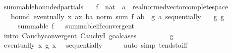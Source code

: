 \begin{isabellebody}
\isanewline
%
\endisadelimproof
\isanewline
{}\isamarkupfalse%
\ summable{\isacharunderscore}{\kern0pt}bounded{\isacharunderscore}{\kern0pt}partials{\isacharcolon}{\kern0pt}\isanewline
\ \ \ f\ {\isacharcolon}{\kern0pt}{\isacharcolon}{\kern0pt}\ {\isachardoublequoteopen}nat\ {\isasymRightarrow}\ {\isacharprime}{\kern0pt}a\ {\isacharcolon}{\kern0pt}{\isacharcolon}{\kern0pt}\ {\isacharbraceleft}{\kern0pt}real{\isacharunderscore}{\kern0pt}normed{\isacharunderscore}{\kern0pt}vector{\isacharcomma}{\kern0pt}complete{\isacharunderscore}{\kern0pt}space{\isacharbraceright}{\kern0pt}{\isachardoublequoteclose}\isanewline
\ \ \ bound{\isacharcolon}{\kern0pt}\ {\isachardoublequoteopen}eventually\ {\isacharparenleft}{\kern0pt}{\isasymlambda}x{}{\isachardot}{\kern0pt}\ {\isasymforall}a{\isasymge}x{}{\isachardot}{\kern0pt}\ {\isasymforall}b{\isachargreater}{\kern0pt}a{\isachardot}{\kern0pt}\ norm\ {\isacharparenleft}{\kern0pt}sum\ f\ {\isacharbraceleft}{\kern0pt}a{\isacharless}{\kern0pt}{\isachardot}{\kern0pt}{\isachardot}{\kern0pt}b{\isacharbraceright}{\kern0pt}{\isacharparenright}{\kern0pt}\ {\isasymle}\ g\ a{\isacharparenright}{\kern0pt}\ sequentially{\isachardoublequoteclose}\isanewline
\ \ \ g{\isacharcolon}{\kern0pt}\ {\isachardoublequoteopen}g\ {\isasymlonglonglongrightarrow}\ {}{\isachardoublequoteclose}\isanewline
\ \ \ \ \ {\isachardoublequoteopen}summable\ f{\isachardoublequoteclose}%
\isadelimproof
\ %
\endisadelimproof
%
\isatagproof
{}\isamarkupfalse%
\ summable{\isacharunderscore}{\kern0pt}iff{\isacharunderscore}{\kern0pt}convergent{\isacharprime}{\kern0pt}\isanewline
{}\isamarkupfalse%
\ {\isacharparenleft}{\kern0pt}intro\ Cauchy{\isacharunderscore}{\kern0pt}convergent\ CauchyI{\isacharprime}{\kern0pt}{\isacharcomma}{\kern0pt}\ goal{\isacharunderscore}{\kern0pt}cases{\isacharparenright}{\kern0pt}\isanewline
\ \ \isamarkupfalse%
\ {\isacharparenleft}{\kern0pt}{}\ {\isasymepsilon}{\isacharparenright}{\kern0pt}\isanewline
\ \ \isamarkupfalse%
\ g\ \isamarkupfalse%
\ {\isachardoublequoteopen}eventually\ {\isacharparenleft}{\kern0pt}{\isasymlambda}x{\isachardot}{\kern0pt}\ {\isasymbar}g\ x{\isasymbar}\ {\isacharless}{\kern0pt}\ {\isasymepsilon}{\isacharparenright}{\kern0pt}\ sequentially{\isachardoublequoteclose}\isanewline
\ \ \ \ \isamarkupfalse%
\ {\isacharparenleft}{\kern0pt}auto\ simp{\isacharcolon}{\kern0pt}\ tendsto{\isacharunderscore}{\kern0pt}iff{\isacharparenright}{\kern0pt}\isanewline

\end{isabellebody}
